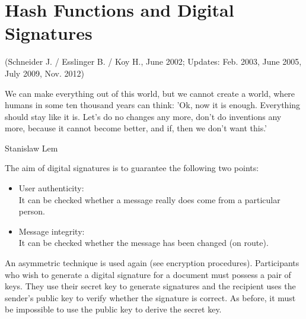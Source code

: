 
\newpage
\hypertarget{Chapter_Hashes-and-Digital-Signatures}{}
\chapter{Hash Functions and Digital Signatures}
\label{Chapter_Hashes-and-Digital-Signatures}
(Schneider J. / Esslinger B. / Koy H., June 2002;
Updates: Feb. 2003, June 2005, July 2009, Nov. 2012)
\begin{ctsquote}
We can make everything out of this world, but we cannot create a world,
where humans in some ten thousand years can think: 'Ok, now it is enough.
Everything should stay like it is. Let's do no changes any more, don't do
inventions any more, because it cannot become better, and if, then we
don't want this.'
\caption[Stanislaw Lem]{Stanislaw Lem\footnotemark}
\end{ctsquote}
\addtocounter{footnote}{0}


\noindent The aim of digital signatures is to guarantee the following two points:
\begin{itemize}
 \item User authenticity:  \\
      It can be checked whether a message really does
come from a particular person.
 \item Message integrity:   \\
      It can be checked whether the message has been
changed (on route).
\end{itemize}


An asymmetric technique is used again (see encryption procedures). Participants
who wish to generate a digital signature for a document must possess a pair of
keys. They use their secret key to generate signatures and the recipient uses
the sender's public key to verify whether the signature is correct. As before,
it must be impossible to use the public key to derive the secret key.


